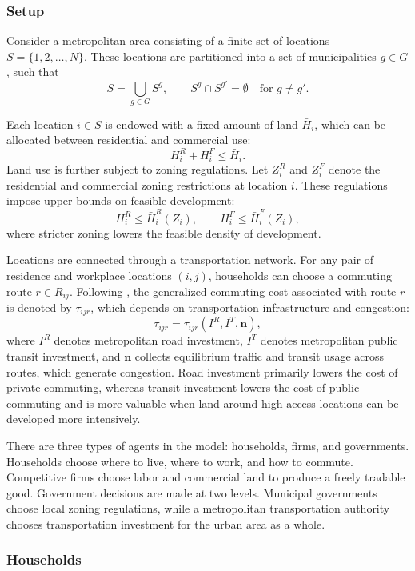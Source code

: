 \documentclass[12pt, a4paper]{article}
\begin{document}
\subsubsection{Setup}
Consider a metropolitan area consisting of a finite set of locations \(S=\{1,2,\dots,N\}\). These locations are partitioned into a set of municipalities \(g\in G\), such that
\[
S=\bigcup_{g\in G} S^g, \qquad S^g \cap S^{g'}=\emptyset \quad \text{for } g\neq g'.
\]

Each location \(i\in S\) is endowed with a fixed amount of land \(\bar H_{i}\), which can be allocated between residential and commercial use:
\[
H_i^R + H_i^F \leq \bar H_{i}.
\]
Land use is further subject to zoning regulations. Let \(Z_i^R\) and \(Z_i^F\) denote the residential and commercial zoning restrictions at location \(i\). These regulations impose upper bounds on feasible development:
\[
H_i^R \leq \bar H_i^R(Z_i), \qquad H_i^F \leq \bar H_i^F(Z_i),
\]
where stricter zoning lowers the feasible density of development.

Locations are connected through a transportation network. For any pair of residence and workplace locations \((i,j)\), households can choose a commuting route \(r \in R_{ij}\). Following \cite{Fajgelbaum2020-yv}, the generalized commuting cost associated with route \(r\) is denoted by \(\tau_{ijr}\), which depends on transportation infrastructure and congestion:
\[
\tau_{ijr} = \tau_{ijr}(I^R, I^T, \mathbf n),
\]
where \(I^R\) denotes metropolitan road investment, \(I^T\) denotes metropolitan public transit investment, and \(\mathbf n\) collects equilibrium traffic and transit usage across routes, which generate congestion. Road investment primarily lowers the cost of private commuting, whereas transit investment lowers the cost of public commuting and is more valuable when land around high-access locations can be developed more intensively.

There are three types of agents in the model: households, firms, and governments. Households choose where to live, where to work, and how to commute. Competitive firms choose labor and commercial land to produce a freely tradable good. Government decisions are made at two levels. Municipal governments choose local zoning regulations, while a metropolitan transportation authority chooses transportation investment for the urban area as a whole.

\subsubsection{Households}
\end{document}
